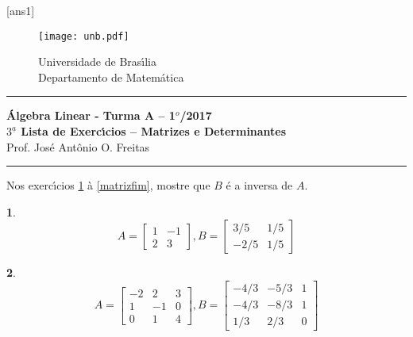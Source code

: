 \documentclass[12pt]{exam}
\newtheorem{exercicio}{}
\newcommand{\vesp}[1]{\vspace{ #1  cm}}
\begin{document}
\pagestyle{empty}

[ans1]

\begin{figure}[h]
        \begin{minipage}[c]{1.7cm}
        \texttt{[image: unb.pdf]}
        \end{minipage}%
        \hspace{0pt}
        \begin{minipage}[c]{4in}
          {Universidade de Bras{\'\i}lia} \\
          {Departamento de Matem{\'a}tica}
\end{minipage}
\end{figure}

\vesp{-0.35} \hrule

\begin{center}
{\Large\bf \'Algebra Linear - Turma A -- 1$^{o}$/2017} \\ \vspace{9pt} {\large\bf
  $3^{\underline{a}}$ Lista de Exerc{\'\i}cios -- Matrizes e Determinantes}\\ \vspace{9pt} Prof. Jos{\'e} Ant{\^o}nio O. Freitas
\end{center}
\hrule

\vesp{.6}

Nos exerc{\'\i}cios \ref{matrizinicio} \`a \ref{matrizfim}, mostre que $B$ \'e a inversa de $A$.
\begin{exercicio}\label{matrizinicio}
\[
  A =\begin{bmatrix}
    1 & -1\\
    2 & 3
  \end{bmatrix}, B =\begin{bmatrix}
    3/5 & 1/5\\
    -2/5 & 1/5
  \end{bmatrix}
\]
\end{exercicio}

\begin{exercicio}
\[
  A =\begin{bmatrix}
    -2 & 2 & 3\\
    1 & -1 & 0\\
    0 & 1 & 4
  \end{bmatrix}, B =\begin{bmatrix}
    -4/3 & -5/3 & 1\\
    -4/3 & -8/3 & 1\\
    1/3 & 2/3 & 0
  \end{bmatrix}
\]
\end{exercicio}
\end{document}
